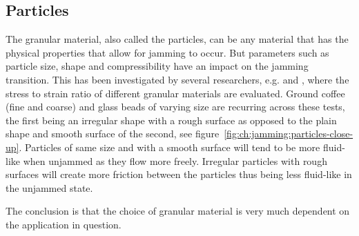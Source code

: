 \subsection{Particles}
\label{ch:jamming:particles}
The granular material, also called the particles, can be any material that has the physical properties that allow for jamming to occur. 
But parameters such as particle size, shape and compressibility have an impact on the jamming transition. 
This has been investigated by several researchers, e.g. \cite{cheng2012design} and \cite{steltz2010jamming}, where the stress to strain ratio  of different granular materials are evaluated. 
Ground coffee (fine and coarse) and glass beads of varying size are recurring across these tests, the first being an irregular shape with a rough surface as opposed to the plain shape and smooth surface of the second, see figure~\ref{fig:ch:jamming:particles-close-up}. 
Particles of same size and with a smooth surface will tend to be more fluid-like when unjammed as they flow more freely. 
Irregular particles with rough surfaces will create more friction between the particles thus being less fluid-like in the unjammed state.

The conclusion is that the choice of granular material is very much dependent on the application in question. 

